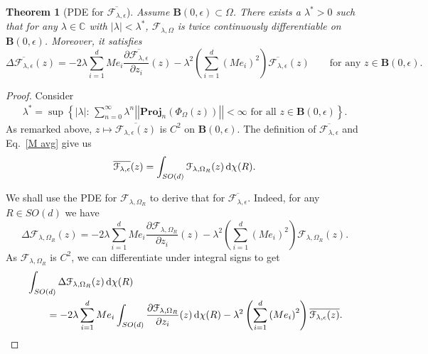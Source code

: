 \documentclass[11pt,a4paper,english,reqno]{amsart}
\theoremstyle{plain}
\newtheorem{theorem}[definition]{Theorem}
\newcommand{\C}{\mathbb{C}}
\newcommand{\dd}{{\rm d}}
\newcommand{\e}{\epsilon}
\newcommand{\1}{\mathbbm{1}}
\newcommand{\B}{\mathbf{B}}
\newcommand{\proj}{\mathbf{Proj}}
\begin{document}
\begin{theorem}[PDE for $\overline{\mathcal{F}_{\lambda,\e}}$]\label{thm: pde for average, new}
Assume $\B(0,\e) \subset \Omega$. There exists a $\lambda^{*} >0$ such that for any $\lambda \in \C$ with $|\lambda| < \lambda^{*}$, $\mathcal{F}_{\lambda, \Omega}$ is twice continuously differentiable on $\B(0,\e)$. Moreover, it satisfies
\begin{equation}
\Delta \overline{\mathcal{F}_{\lambda, \e}}(z)=-2\lambda\sum_{i=1}^{d}Me_{i}\frac{\partial \overline{\mathcal{F}_{\lambda, \e}}}{\partial z_{i}}(z)-\lambda^{2}\left(\sum_{i=1}^{d}\left(Me_{i}\right)^{2}\right)\overline{\mathcal{F}_{\lambda, \e}}(z) \qquad\text{for any $z \in \B(0,\e)$}.\label{eq:Lemma2PDE} 
\end{equation}
\end{theorem}
\begin{proof}
Consider
\begin{eqnarray}\label{lambda star}
\lambda^{*} = \sup\left\{|\lambda| :\,\sum_{n = 0}^{\infty} \lambda^{n} \left\vert\left\vert \proj_{n}(\Phi_{\Omega}(z))\right\vert\right\vert < \infty \text{ for all }  z \in \B(0, \e)\right\}.
\end{eqnarray}
As remarked above, $z \mapsto \overline{\mathcal{F}_{\lambda, \e}(z)}$ is $C^2$ on $\B(0, \e)$. The definition of $\overline{\mathcal{F}_{\lambda, \e}}$ and Eq.~\eqref{M avg} give us
\begin{equation}\label{F avg}
\overline{\mathcal{F}_{\lambda,\e}}(z) =  \int_{SO(d)}\mathcal{F}_{\lambda, \Omega_{R}}(z) \,\dd\chi(R).
\end{equation}


We shall use the PDE for $\mathcal{F}_{\lambda, \Omega_{R}}$ to derive that for $\overline{\mathcal{F}_{\lambda,\e}}$. Indeed, for any $R \in SO(d)$ we have
\begin{equation*}
\Delta \mathcal{F}_{\lambda, \Omega_{R}}(z)=-2\lambda\sum_{i=1}^{d}Me_{i}\frac{\partial \mathcal{F}_{\lambda, \Omega_{R}}}{\partial z_{i}}(z)-\lambda^{2}\left(\sum_{i=1}^{d}\left(Me_{i}\right)^{2}\right)\mathcal{F}_{\lambda, \Omega_{R}}(z).  
\end{equation*}
As $\mathcal{F}_{\lambda,\Omega_R}$ is $C^2$, we can differentiate under integral signs to get
\begin{align}\label{eqn_F_alpha}
&\int_{SO(d)} \Delta \mathcal{F}_{\lambda, \Omega_{R}}(z) \,\dd\chi(R)\nonumber\\
&\qquad =-2\lambda\sum_{i=1}^{d}Me_{i}\int_{SO(d)} \frac{\partial \mathcal{F}_{\lambda, \Omega_{R}}}{\partial z_{i}}(z)\,\dd\chi(R) -\lambda^{2}\left(\sum_{i=1}^{d}\left(Me_{i}\right)^{2}\right)\overline{ \mathcal{F}_{\lambda, \e}(z)}.  
\end{align}   \end{proof}
\end{document}
